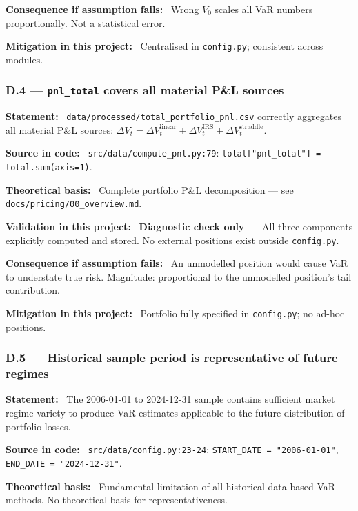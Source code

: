 \documentclass[11pt,a4paper]{article}
\newcommand{\asmfield}[1]{\medskip\noindent\textbf{#1:}\ }
\newcommand{\code}[1]{\texttt{#1}}
\newcommand{\diagnostic}{\textbf{Diagnostic check only}}
\begin{document}
\asmfield{Consequence if assumption fails}
Wrong $V_0$ scales all VaR numbers proportionally. Not a statistical error.

\asmfield{Mitigation in this project}
Centralised in \code{config.py}; consistent across modules.

\subsubsection{D.4 --- \texttt{pnl\_total} covers all material P\&L sources}\label{asm:D4}

\asmfield{Statement}
\code{data/processed/total\_portfolio\_pnl.csv} correctly aggregates all
material P\&L sources: $\Delta V_t = \Delta V_t^{\text{linear}} +
\Delta V_t^{\text{IRS}} + \Delta V_t^{\text{straddle}}$.

\asmfield{Source in code}
\code{src/data/compute\_pnl.py:79}: \lstinline|total["pnl_total"] = total.sum(axis=1)|.

\asmfield{Theoretical basis}
Complete portfolio P\&L decomposition --- see \code{docs/pricing/00\_overview.md}.

\asmfield{Validation in this project}
\diagnostic\ --- All three components explicitly computed and stored. No
external positions exist outside \code{config.py}.

\asmfield{Consequence if assumption fails}
An unmodelled position would cause VaR to understate true risk.
Magnitude: proportional to the unmodelled position's tail contribution.

\asmfield{Mitigation in this project}
Portfolio fully specified in \code{config.py}; no ad-hoc positions.

\subsubsection{D.5 --- Historical sample period is representative of future regimes}\label{asm:D5}

\asmfield{Statement}
The 2006-01-01 to 2024-12-31 sample contains sufficient market regime
variety to produce VaR estimates applicable to the future distribution of
portfolio losses.

\asmfield{Source in code}
\code{src/data/config.py:23-24}: \lstinline|START_DATE = "2006-01-01"|,
\lstinline|END_DATE = "2024-12-31"|.

\asmfield{Theoretical basis}
Fundamental limitation of all historical-data-based VaR methods. No
theoretical basis for representativeness.
\end{document}
